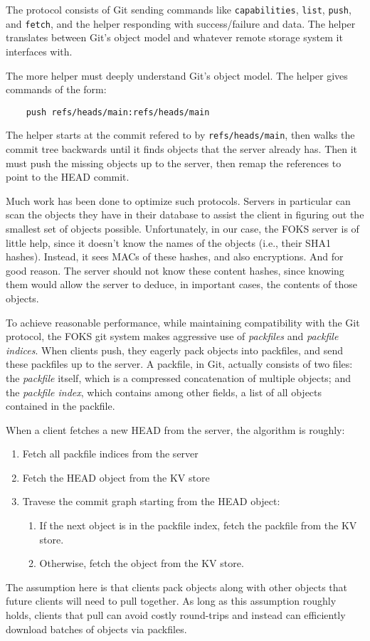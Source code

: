 The protocol consists of Git sending commands like \texttt{capabilities},
\texttt{list}, \texttt{push}, and \texttt{fetch}, and the helper responding
with success/failure and data. The helper translates between
Git's object model and whatever remote storage system it interfaces with.

The more helper must deeply understand Git's object model. The 
helper gives commands of the form:
%
\begin{verbatim}
    push refs/heads/main:refs/heads/main
\end{verbatim}
%
The helper starts at the commit refered to by \texttt{refs/heads/main},
then walks the commit tree backwards until it finds objects that the
server already has. Then it must push the missing objects up to the server,
then remap the references to point to the HEAD commit.

Much work has been done to optimize such protocols. Servers in particular
can scan the objects they have in their database to assist the client
in figuring out the smallest set of objects possible. Unfortunately,
in our case, the FOKS server is of little help, since it doesn't
know the names of the objects (i.e., their SHA1 hashes). Instead, it
sees MACs of these hashes, and also encryptions. And for good reason.
The server should not know these content hashes, since knowing them
would allow the server to deduce, in important cases, the contents
of those objects. 

To achieve reasonable performance, while maintaining compatibility
with the Git protocol, the FOKS git system makes aggressive use
of \textit{packfiles} and \textit{packfile indices}. When
clients push, they eagerly pack objects into packfiles, 
and send these packfiles up to the server. A packfile, in Git, 
actually consists of two files: the \textit{packfile} itself,
which is a compressed concatenation of multiple objects; and
the \textit{packfile index}, which contains among other fields,
a list of all objects contained in the packfile. 

When a client fetches a new HEAD from the server, the algorithm is roughly:
%
\begin{enumerate}[itemsep=2pt,parsep=0pt]
    \item Fetch all packfile indices from the server
    \item Fetch the HEAD object from the KV store
    \item Travese the commit graph starting from the HEAD object:
    \begin{enumerate}[itemsep=2pt,parsep=0pt]
        \item If the next object is in the packfile index, fetch
             the packfile from the KV store.
        \item Otherwise, fetch the object from the KV store.
    \end{enumerate}
\end{enumerate}
%
The assumption here is that clients pack objects along with other
objects that future clients will need to pull together. As long
as this assumption roughly holds, clients that pull can avoid
costly round-trips and instead can efficiently download batches of objects
via packfiles.